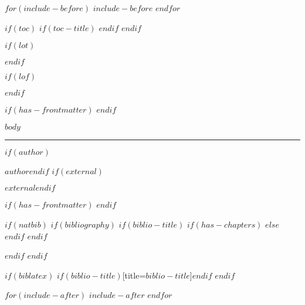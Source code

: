 \documentclass[
$if(fontsize)$$fontsize$,$endif$%
$if(lang)$$babel-lang$,$endif$%
$if(papersize)$$papersize$paper,$endif$%
$for(classoption)$$classoption$$sep$,$endfor$]%
{article}%
\begin{document}
$for(include-before)$
$include-before$
$endfor$

$if(toc)$
$if(toc-title)$
\renewcommand*\contentsname{$toc-title$}
$endif$
$endif$

$if(lot)$
\listoftables
$endif$

$if(lof)$
\listoffigures
$endif$

$if(has-frontmatter)$
\mainmatter
$endif$

$body$


\vspace{10pt}\vfill\hrule
\begin{description}
$if(author)$\item[Course Responsible:] $author$$endif$
$if(external)$\item[External Examiner:] $external$$endif$
\end{description}

$if(has-frontmatter)$
\backmatter
$endif$

$if(natbib)$
$if(bibliography)$
$if(biblio-title)$
$if(has-chapters)$
\renewcommand\bibname{$biblio-title$}
$else$
\renewcommand\refname{$biblio-title$}
$endif$ %
$endif$ %

$endif$ %
$endif$ %

$if(biblatex)$
\printbibliography$if(biblio-title)$[title=$biblio-title$]$endif$
$endif$

$for(include-after)$
$include-after$
$endfor$
\end{document}

